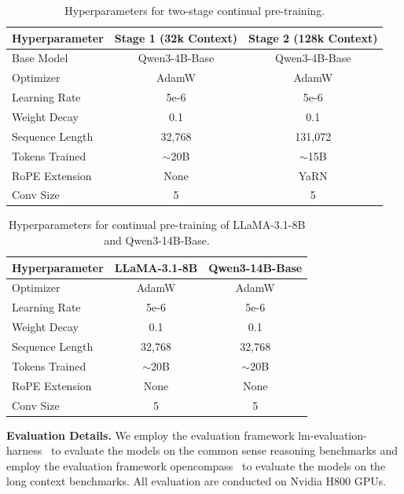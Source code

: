 \begin{table}[h!]
\centering
\caption{Hyperparameters for two-stage continual pre-training.}
\label{tab:continual_hparams}
\begin{tabular}{lcc}
\toprule
\textbf{Hyperparameter} & \textbf{Stage 1 (32k Context)} & \textbf{Stage 2 (128k Context)} \\
\midrule
Base Model & {Qwen3-4B-Base}& {Qwen3-4B-Base} \\
Optimizer & {AdamW} & AdamW \\
Learning Rate & {5e-6} & {5e-6} \\
Weight Decay & {0.1} & {0.1} \\
\midrule
Sequence Length & 32,768 & 131,072 \\
Tokens Trained & $\sim$20B & $\sim$15B \\
RoPE Extension & None & {YaRN} \\
Conv Size  & 5 & 5 \\
\bottomrule
\end{tabular}
\end{table}

\begin{table}[h!]
\centering
\caption{Hyperparameters for continual pre-training of LLaMA-3.1-8B and Qwen3-14B-Base.}
\label{tab:continual_hparams_ext}
\begin{tabular}{lcc}
\toprule
\textbf{Hyperparameter} & \textbf{LLaMA-3.1-8B} & \textbf{Qwen3-14B-Base} \\
\midrule
Optimizer & AdamW & AdamW \\
Learning Rate & 5e-6 & 5e-6 \\
Weight Decay & 0.1 & 0.1 \\
\midrule
Sequence Length & 32,768 & 32,768 \\
Tokens Trained & $\sim$20B & $\sim$20B \\
RoPE Extension & None & None \\
Conv Size  & 5 & 5 \\
\bottomrule
\end{tabular}
\end{table}


\textbf{Evaluation Details.} We employ the evaluation framework lm-evaluation-harness~\citep{eval-harness} to evaluate the models on the common sense reasoning benchmarks and employ the evaluation framework opencompass~\citep{2023opencompass} to evaluate the models on the long context benchmarks. All evaluation are conducted on Nvidia H800 GPUs.

